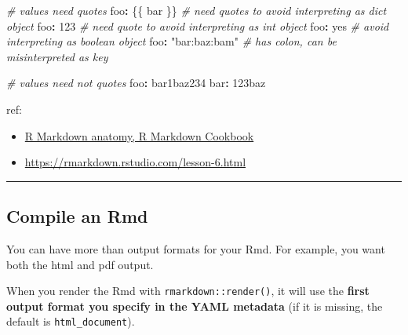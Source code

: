 \documentclass[
  a4paper,
  twoside,
  openright]{book}
\newenvironment{Shaded}{\begin{snugshade}}{\end{snugshade}}
\newcommand{\CommentTok}[1]{\textcolor[rgb]{0.56,0.35,0.01}{\textit{#1}}}
\newcommand{\DecValTok}[1]{\textcolor[rgb]{0.00,0.00,0.81}{#1}}
\newcommand{\NormalTok}[1]{#1}
\newcommand{\SpecialCharTok}[1]{\textcolor[rgb]{0.81,0.36,0.00}{\textbf{#1}}}
\newcommand{\StringTok}[1]{\textcolor[rgb]{0.31,0.60,0.02}{#1}}
\providecommand{\tightlist}{%
  \setlength{\itemsep}{0pt}\setlength{\parskip}{0pt}}
\theoremstyle{definition}
\theoremstyle{definition}
\theoremstyle{definition}
\theoremstyle{definition}
\theoremstyle{remark}
\begin{document}
\begin{Shaded}
\begin{Highlighting}[]
\CommentTok{\# values need quotes}
\NormalTok{foo}\SpecialCharTok{:} \StringTok{\textquotesingle{}\{\{ bar \}\}\textquotesingle{}} \CommentTok{\# need quotes to avoid interpreting as \textasciigrave{}dict\textasciigrave{} object}
\NormalTok{foo}\SpecialCharTok{:} \StringTok{\textquotesingle{}123\textquotesingle{}}       \CommentTok{\# need quote to avoid interpreting as \textasciigrave{}int\textasciigrave{} object}
\NormalTok{foo}\SpecialCharTok{:} \StringTok{\textquotesingle{}yes\textquotesingle{}}           \CommentTok{\# avoid interpreting as \textasciigrave{}boolean\textasciigrave{} object}
\NormalTok{foo}\SpecialCharTok{:} \StringTok{"bar:baz:bam"} \CommentTok{\# has colon, can be misinterpreted as key}

\CommentTok{\# values need not quotes}
\NormalTok{foo}\SpecialCharTok{:}\NormalTok{ bar1baz234}
\NormalTok{bar}\SpecialCharTok{:} \DecValTok{123}\NormalTok{baz}
\end{Highlighting}
\end{Shaded}

ref:

\begin{itemize}
\tightlist
\item
  \href{https://bookdown.org/yihui/rmarkdown-cookbook/rmarkdown-anatomy.html\#:~:text=In\%20short\%2C\%20we\%20can\%20include\%20variables\%20and\%20R\%20expressions\%20in\%20this\%20header\%20that\%20can\%20be\%20referenced\%20throughout\%20our\%20R\%20Markdown\%20document.}{R Markdown anatomy, R Markdown Cookbook}
\item
  \url{https://rmarkdown.rstudio.com/lesson-6.html}
\end{itemize}

\begin{center}\rule{0.5\linewidth}{0.5pt}\end{center}

\subsection*{Compile an Rmd}\label{compile-an-rmd}

You can have more than output formats for your Rmd. For example, you want both the html and pdf output.

When you render the Rmd with \texttt{rmarkdown::render()}, it will use the \textbf{first output format you specify in the YAML metadata} (if it is missing, the default is \texttt{html\_document}).
\end{document}
